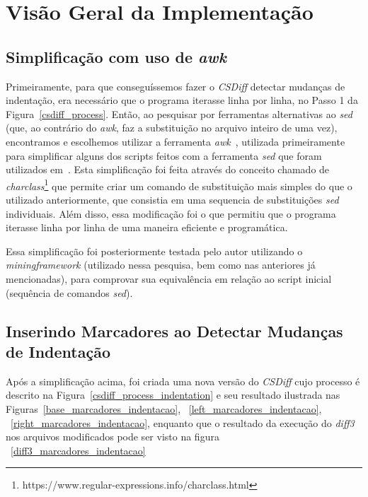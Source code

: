 \section{Visão Geral da Implementação}\label{implementacao}
\subsection{Simplificação com uso de \emph{awk}}

Primeiramente, para que conseguíssemos fazer o \emph{CSDiff} detectar mudanças
de indentação, era necessário que o programa iterasse linha por linha, no Passo
1 da Figura~\ref{csdiff_process}. Então, ao pesquisar por ferramentas
alternativas ao \emph{sed} (que, ao contrário do \emph{awk}, faz a substituição
no arquivo inteiro de uma vez), encontramos e escolhemos utilizar a ferramenta
\emph{awk}~\cite{awk}, utilizada primeiramente para simplificar alguns dos
scripts feitos com a ferramenta \emph{sed} que foram utilizados
em~\cite{clem21,heitor21}. Esta simplificação foi feita através do conceito
chamado de
\emph{charclass}\footnote{https://www.regular-expressions.info/charclass.html}
que permite criar um comando de substituição mais simples do que o utilizado
anteriormente, que consistia em uma sequencia de substituições \emph{sed}
individuais. Além disso, essa modificação foi o que permitiu que o programa
iterasse linha por linha de uma maneira eficiente e programática.

Essa simplificação foi posteriormente testada pelo autor utilizando o
\emph{miningframework} (utilizado nessa pesquisa, bem como nas anteriores já
mencionadas), para comprovar sua equivalência em relação ao script inicial
(sequência de comandos \emph{sed}).

\subsection{Inserindo Marcadores ao Detectar Mudanças de Indentação}

Após a simplificação acima, foi criada uma nova versão do \emph{CSDiff} cujo
processo é descrito na Figura~\ref{csdiff_process_indentation} e seu resultado
ilustrada nas Figuras~\ref{base_marcadores_indentacao},
~\ref{left_marcadores_indentacao}, ~\ref{right_marcadores_indentacao}, enquanto
que o resultado da execução do \emph{diff3} nos arquivos modificados pode
ser visto na figura ~\ref{diff3_marcadores_indentacao}

